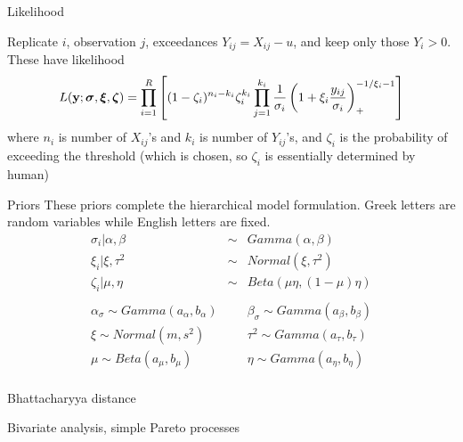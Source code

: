 \documentclass[mathserif, 11pt, t]{beamer}
\begin{document}
\begin{frame}{Likelihood}

Replicate $i$, observation $j$, exceedances $Y_{ij} = X_{ij} - u$, and keep only those $Y_i > 0$. These have likelihood
\[ L(\mathbf{\bm{y}}; \mathbf{\bm{\sigma}}, \mathbf{\bm{\xi}}, \mathbf{\bm{\zeta}}) = \prod_{i=1}^R\left[(1-\zeta_i)^{n_i-k_i}\zeta_i^{k_i}\prod_{j=1}^{k_i}\frac{1}{\sigma_i}\left(1+\xi_i\frac{y_{ij}}{\sigma_i}\right)_+^{-1/\xi_i-1}\right] \]
where $n_i$ is number of $X_{ij}$'s and $k_i$ is number of $Y_{ij}$'s, and $\zeta_i$ is the probability of exceeding the threshold (which is chosen, so $\zeta_i$ is essentially determined by human)

\end{frame}


\begin{frame}{Priors}
\noindent These priors complete the hierarchical model formulation. Greek letters are random variables while English letters are fixed.
\begin{eqnarray*}
\sigma_i|\alpha, \beta &\sim& Gamma(\alpha, \beta) \\
\xi_i|\xi, \tau^2  &\sim& Normal(\xi, \tau^2) \\
\zeta_i|\mu, \eta &\sim& Beta(\mu\eta, (1-\mu)\eta) \\
 \\
\alpha_\sigma \sim Gamma(a_\alpha, b_\alpha)&  &\beta_\sigma \sim Gamma(a_\beta, b_\beta) \\
\xi \sim Normal(m, s^2)&  &\tau^2 \sim Gamma(a_\tau, b_\tau) \\
\mu \sim Beta(a_\mu, b_\mu)&  &\eta \sim Gamma(a_\eta, b_\eta) \\
\end{eqnarray*}

\end{frame}


\begin{frame}{Bhattacharyya distance}

\end{frame}



\begin{frame}{Bivariate analysis, simple Pareto processes}

\end{frame}
\end{document}
